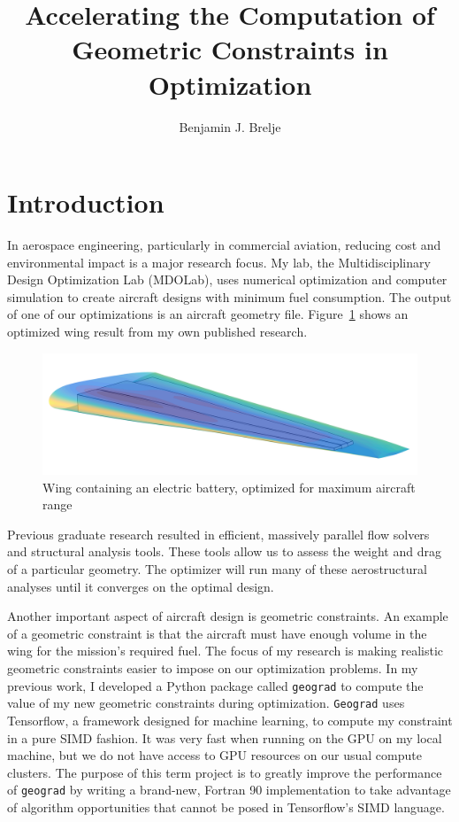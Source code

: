 \documentclass[11pt,letterpaper]{article}
\title{Accelerating the Computation of Geometric Constraints in Optimization}
\author{Benjamin J. Brelje}
\begin{document}
\maketitle

\section{Introduction}
\qquad In aerospace engineering, particularly in commercial aviation, reducing cost and environmental impact is a major research focus.
My lab, the Multidisciplinary Design Optimization Lab (MDOLab), uses numerical optimization and computer simulation to create aircraft designs with minimum fuel consumption.
The output of one of our optimizations is an aircraft geometry file.
Figure~\ref{fig:optimized} shows an optimized wing result from my own published research.

\begin{figure}[ht]
  \centering
  \includegraphics[width=0.45\linewidth]{figures/wing_final_rect.png}
  \caption{Wing containing an electric battery, optimized for maximum aircraft range~\cite{Brelje2019c}}
  \label{fig:optimized}
\end{figure}

\qquad Previous graduate research resulted in efficient, massively parallel flow solvers and structural analysis tools.
These tools allow us to assess the weight and drag of a particular geometry.
The optimizer will run many of these aerostructural analyses until it converges on the optimal design.

\qquad Another important aspect of aircraft design is geometric constraints.
An example of a geometric constraint is that the aircraft must have enough volume in the wing for the mission's required fuel.
The focus of my research is making realistic geometric constraints easier to impose on our optimization problems.
In my previous work, I developed a Python package called \texttt{geograd} to compute the value of my new geometric constraints during optimization.
\texttt{Geograd} uses Tensorflow, a framework designed for machine learning, to compute my constraint in a pure SIMD fashion.
It was very fast when running on the GPU on my local machine, but we do not have access to GPU resources on our usual compute clusters.
The purpose of this term project is to greatly improve the performance of \texttt{geograd} by writing a brand-new, Fortran 90 implementation to take advantage of algorithm opportunities that cannot be posed in Tensorflow's SIMD language.
\end{document}

